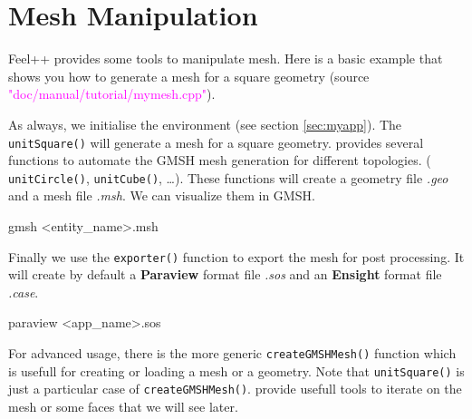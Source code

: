%


\section{Mesh Manipulation}
\label{sec:mymesh}

Feel++ provides some tools to manipulate mesh. 
Here is a basic example that shows
you how to generate a mesh for a square geometry
(source \textcolor{magenta}{"doc/manual/tutorial/mymesh.cpp"}).
%
\vspace{2mm}

\vspace{2mm}

As always, we initialise the \feel environment (see section \ref{sec:myapp}).
The \lstinline!unitSquare()! will generate a mesh for a square geometry.
\feel provides several functions to automate the GMSH mesh generation
for different topologies.
%
( \lstinline!unitCircle()!,
  \lstinline!unitCube()!,
  \dots ).
%
These functions will create a geometry file
\textit{.geo} and a mesh file \textit{.msh}. We can visualize them in GMSH. 
%
\begin{unixcom}
    gmsh <entity_name>.msh
\end{unixcom}
%
Finally we use the \lstinline!exporter()! function to export the mesh for post processing.
It will create by default a \textbf{Paraview} format file \textit{.sos} and an \textbf{Ensight}
format file \textit{.case}.
%
\begin{unixcom}
    paraview <app_name>.sos
\end{unixcom}
%
For advanced usage, there is the more generic \lstinline!createGMSHMesh()! function which is
usefull for creating or loading a mesh or a geometry.
Note that \lstinline!unitSquare()! is just a particular case of \lstinline!createGMSHMesh()!.
\feel provide usefull tools to iterate on the mesh or some faces that we will see later.
%

